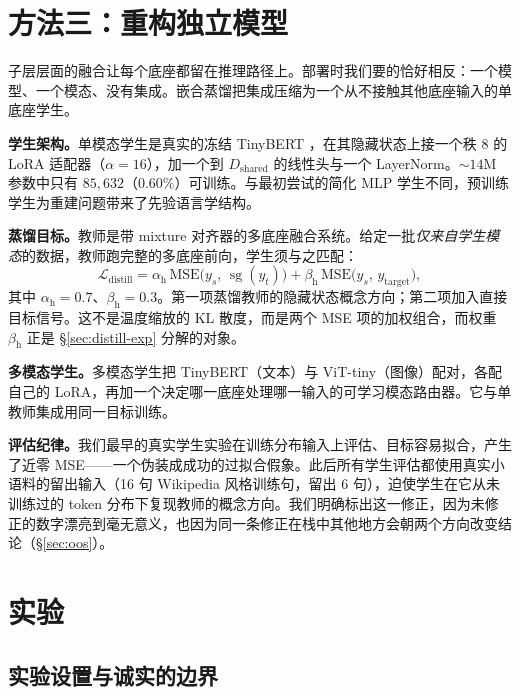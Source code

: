 \documentclass[10pt,twoside]{article}
\newcommand{\stopgrad}{\operatorname{sg}}
\theoremstyle{definition}
\theoremstyle{plain}
\theoremstyle{remark}
\begin{document}
\section{方法三：重构独立模型}
\label{sec:distill}

子层层面的融合让每个底座都留在推理路径上。部署时我们要的恰好相反：一个模型、一个模态、没有集成。嵌合蒸馏把集成压缩为一个从不接触其他底座输入的单底座学生。

\textbf{学生架构。}单模态学生是真实的冻结 TinyBERT \citep{jiao2020}，在其隐藏状态上接一个秩 8 的 LoRA 适配器（$\alpha{=}16$），加一个到 $D_{\text{shared}}$ 的线性头与一个 LayerNorm。${\sim}14$M 参数中只有 $85{,}632$（$0.60\%$）可训练。与最初尝试的简化 MLP 学生不同，预训练学生为重建问题带来了先验语言学结构。

\textbf{蒸馏目标。}教师是带 mixture 对齐器的多底座融合系统。给定一批\emph{仅来自学生模态}的数据，教师跑完整的多底座前向，学生须与之匹配：
\begin{equation}
\label{eq:distill}
\mathcal{L}_{\text{distill}} = \alpha_{\text{h}} \, \mathrm{MSE}\big(y_s,\, \stopgrad(y_t)\big) + \beta_{\text{h}} \, \mathrm{MSE}\big(y_s,\, y_{\text{target}}\big),
\end{equation}
其中 $\alpha_{\text{h}} = 0.7$、$\beta_{\text{h}} = 0.3$。第一项蒸馏教师的隐藏状态概念方向；第二项加入直接目标信号。这不是温度缩放的 KL 散度，而是两个 MSE 项的加权组合，而权重 $\beta_{\text{h}}$ 正是 \S\ref{sec:distill-exp} 分解的对象。

\textbf{多模态学生。}多模态学生把 TinyBERT（文本）与 ViT-tiny（图像）配对，各配自己的 LoRA，再加一个决定哪一底座处理哪一输入的可学习模态路由器。它与单教师集成用同一目标训练。

\textbf{评估纪律。}我们最早的真实学生实验在训练分布输入上评估、目标容易拟合，产生了近零 MSE——一个伪装成成功的过拟合假象。此后所有学生评估都使用真实小语料的留出输入（16 句 Wikipedia 风格训练句，留出 6 句），迫使学生在它从未训练过的 token 分布下复现教师的概念方向。我们明确标出这一修正，因为未修正的数字漂亮到毫无意义，也因为同一条修正在栈中其他地方会朝两个方向改变结论（\S\ref{sec:oos}）。

\section{实验}
\label{sec:exp}

\subsection{实验设置与诚实的边界}
\label{sec:exp-setup}
\end{document}
